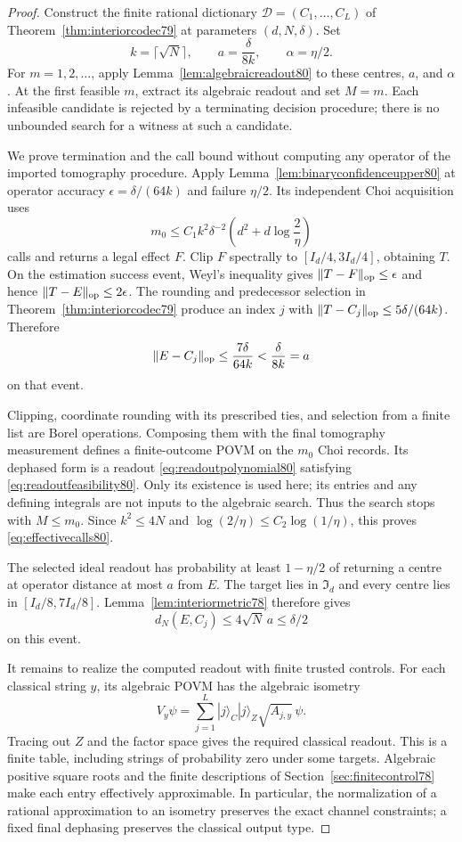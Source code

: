 \begin{proof}
Construct the finite rational dictionary $\mathcal D=(C_1,\ldots,C_L)$
of Theorem~\ref{thm:interiorcodec79} at parameters $(d,N,\delta)$.
Set
\[
 k=\lceil\sqrt N\rceil,
 \qquad a=\frac{\delta}{8k},\qquad\alpha=\eta/2.
\]
For $m=1,2,\ldots$, apply Lemma~\ref{lem:algebraicreadout80} to
these centres, $a$, and $\alpha$.  At the first feasible $m$,
extract its algebraic readout and set $M=m$.  Each infeasible
candidate is rejected by a terminating decision procedure; there
is no unbounded search for a witness at such a candidate.

We prove termination and the call bound without computing any
operator of the imported tomography procedure.  Apply
Lemma~\ref{lem:binaryconfidenceupper80} at operator accuracy
$\epsilon=\delta/(64k)$ and failure $\eta/2$.  Its independent
Choi acquisition uses
\[
 m_0\le C_1 k^2\delta^{-2}
                 \left(d^2+d\log\frac2\eta\right)
\]
calls and returns a legal effect $F$.  Clip $F$ spectrally to
$[I_d/4,3I_d/4]$, obtaining $T$.  On the estimation success event,
Weyl's inequality gives $\|T-F\|_{\rm op}\le\epsilon$ and hence
$\|T-E\|_{\rm op}\le2\epsilon$.  The rounding and predecessor
selection in Theorem~\ref{thm:interiorcodec79} produce an index $j$
with $\|T-C_j\|_{\rm op}\le5\delta/(64k)$.  Therefore
\begin{equation}\label{eq:effectiveexistence80}
 \|E-C_j\|_{\rm op}
 \le\frac{7\delta}{64k}<\frac{\delta}{8k}=a
\end{equation}
on that event.

Clipping, coordinate rounding with its prescribed ties, and
selection from a finite list are Borel operations.  Composing them
with the final tomography measurement defines a finite-outcome
POVM on the $m_0$ Choi records.  Its dephased form is a readout
\eqref{eq:readoutpolynomial80} satisfying
\eqref{eq:readoutfeasibility80}.  Only its existence is used here;
its entries and any defining integrals are not inputs to the
algebraic search.  Thus the search stops with $M\le m_0$.
Since $k^2\le4N$ and
$\log(2/\eta)\le C_2\log(1/\eta)$, this proves
\eqref{eq:effectivecalls80}.

The selected ideal readout has probability at least $1-\eta/2$ of
returning a centre at operator distance at most $a$ from $E$.
The target lies in $\mathfrak I_d$ and every centre lies in
$[I_d/8,7I_d/8]$.  Lemma~\ref{lem:interiormetric78} therefore gives
\[
 d_N(E,C_j)\le4\sqrt N\,a\le\delta/2
\]
on this event.

It remains to realize the computed readout with finite trusted
controls.  For each classical string $y$, its algebraic POVM has
the algebraic isometry
\[
 V_y\psi=\sum_{j=1}^L|j\rangle_C|j\rangle_Z
                         \sqrt{A_{j,y}}\,\psi.
\]
Tracing out $Z$ and the factor space gives the required classical
readout.  This is a finite table, including strings of probability
zero under some targets.  Algebraic positive square roots and the
finite descriptions of Section~\ref{sec:finitecontrol78} make each
entry effectively approximable.  In particular, the normalization
of a rational approximation to an isometry preserves the exact
channel constraints; a fixed final dephasing preserves the
classical output type.


\end{proof}
